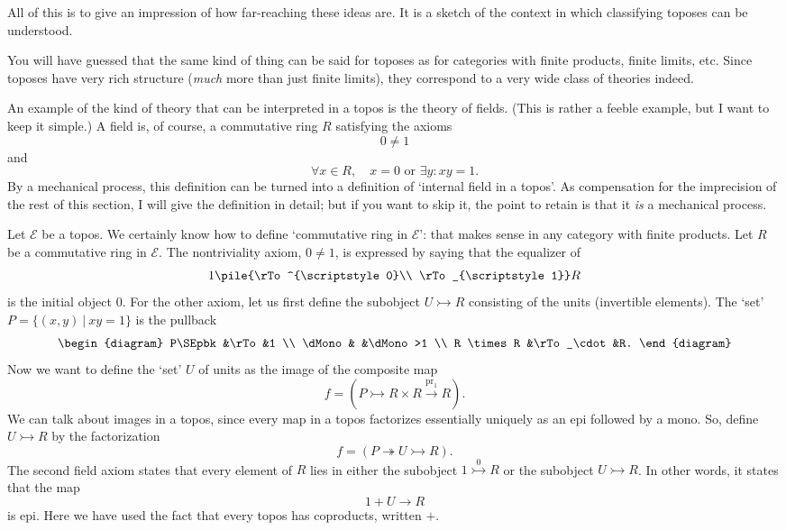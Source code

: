 \documentclass[12pt]{article}
\newcommand{\cat}[1]{\mathscr{#1}}
\newcommand{\such}{\:|\:}
\newcommand{\parpair}[2]{\pile{\rTo^{\scriptstyle #1}\\ 
\rTo_{\scriptstyle #2}}}
\newcommand{\pr}{\mathrm{pr}}
\newcommand{\E}{\cat{E}}
\newcommand{\toby}[1]{\stackrel{#1}{\to}}
\newcommand{\monic}{\rightarrowtail}
\newcommand{\monicby}[1]{\stackrel{#1}{\monic}}
\newcommand{\epic}{\twoheadrightarrow}
\newcommand{\cln}{\colon}
\begin{document}
All of this is to give an impression of how far-reaching these ideas
are.  It is a sketch of the context in which classifying toposes can be
understood.

You will have guessed that the same kind of thing can be said for toposes as
for categories with finite products, finite limits, etc.  Since toposes have
very rich structure (\emph{much} more than just finite limits), they
correspond to a very wide class of theories indeed.  

An example of the kind of theory that can be interpreted in a topos is the
theory of fields.  (This is rather a feeble example, but I want to
keep it simple.)  A field is, of course, a commutative ring $R$ satisfying the
axioms 
% 
\begin{equation}        \label{eq:field-nontriv}
0 \neq 1
\end{equation}
% 
and
% 
\begin{equation}        \label{eq:field-main}
\forall x \in R, 
\quad 
x = 0 \textrm{ or } \exists y\cln xy = 1.
\end{equation}
% 
By a mechanical process, this definition can be turned into a definition of
`internal field in a topos'.  As compensation for the imprecision of the rest
of this section, I will give the definition in detail; but if you want to skip
it, the point to retain is that it \emph{is} a mechanical process.

Let $\E$ be a topos.  We certainly know how to define `commutative ring in
$\E$': that makes sense in any category with finite products.  Let $R$ be a
commutative ring in $\E$.  The nontriviality axiom, $0 \neq 1$, is expressed
by saying that 
% 
the equalizer of
\[
1 \parpair{0}{1} R
\]
is the initial object $0$.  For the other axiom, let us first define the
subobject $U \monic R$ consisting of the units (invertible elements).  The
`set' $P = \{ (x, y) \such xy = 1 \}$ is the pullback
\[
\begin{diagram}
P\SEpbk         &\rTo           &1              \\
\dMono          &               &\dMono>1       \\
R \times R      &\rTo_\cdot     &R.
\end{diagram}
\]
Now we want to define the `set' $U$ of units as the image of the composite map 
\[
f 
= 
\left(
P \monic R \times R \toby{\pr_1} R
\right).
\]
We can talk about images in a topos, since every map in a topos
factorizes essentially uniquely as an epi followed by a mono.  So, define $U
\monic R$ by the factorization
\[
f 
=
\left(
P \epic U \monic R
\right).
\]
The second field axiom states that every element of $R$ lies in either the
subobject $1 \monicby{0} R$ or the subobject $U \monic R$.  In other words, it
states that the map
\[
1 + U \to R
\]
is epi.  Here we have used the fact that every topos has coproducts, written
$+$.  
\end{document}
